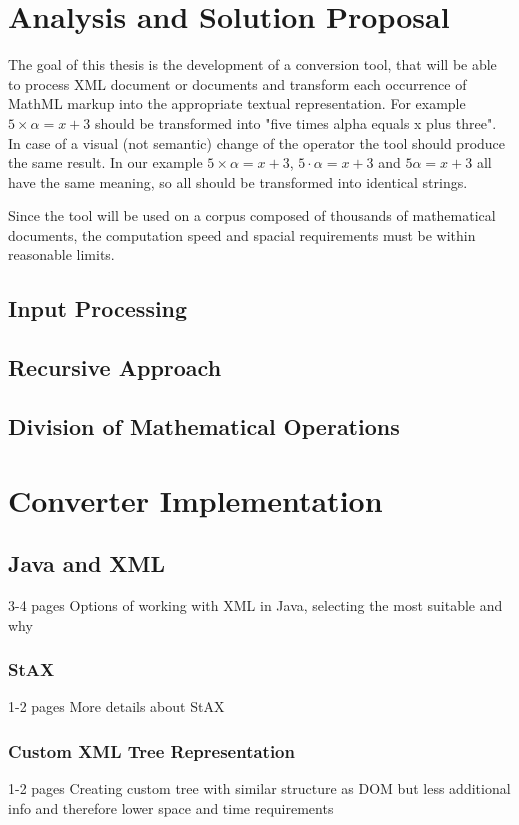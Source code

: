 \documentclass[11pt,oneside,final]{fithesis2}
\begin{document}
\chapter{Analysis and Solution Proposal}
The goal of this thesis is the development of a conversion tool, that will be able to process XML document or documents and transform each occurrence of MathML markup into the appropriate textual representation. For example $5 \times \alpha = x + 3$ should be transformed into "five times alpha equals x plus three". In case of a visual (not semantic) change of the operator the tool should produce the same result. In our example $5 \times \alpha = x + 3$, $5 \cdot \alpha = x + 3$ and $5\alpha = x + 3$ all have the same meaning, so all should be transformed into identical strings.

Since the tool will be used on a corpus composed of thousands of mathematical documents, the computation speed and spacial requirements must be within reasonable limits. 


\section{Input Processing}


\section{Recursive Approach}
\section{Division of Mathematical Operations}

\chapter{Converter Implementation}
\section{Java and XML}
3-4 pages Options of working with XML in Java, selecting the most suitable and why
\subsection{StAX}
1-2 pages More details about StAX
\subsection{Custom XML Tree Representation}
1-2 pages Creating custom tree with similar structure as DOM but less additional info and therefore lower space and time requirements
\end{document}
